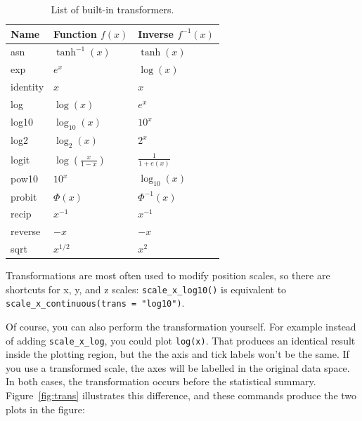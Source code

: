 \begin{table}
  \centering
  \begin{tabular}{lll}
    \toprule
    Name & Function $f(x)$ & Inverse $f^{-1}(x)$ \\
    \midrule
    asn       & $\tanh^{-1}(x)$ & $\tanh(x)$ \\
    exp       & $e ^ x$         & $\log(x)$  \\
    identity  & $x$             & $x$        \\
    log       & $\log(x)$       & $e ^ x$    \\
    log10     & $\log_{10}(x)$  & $10 ^ x$   \\
    log2      & $\log_2(x)$     & $2 ^ x$    \\
    logit     & $\log(\frac{x}{1 - x})$ & $\frac{1}{1 + e(x)} $ \\
    pow10     & $10^x$          & $\log_{10}(x) $ \\
    probit    & $\Phi(x)$       & $\Phi^{-1}(x)$ \\
    recip     & $x^{-1}$        & $x^{-1}$ \\
    reverse   & $-x$            & $-x$     \\
    sqrt      & $x^{1/2}$       & $x ^ 2$  \\
    \bottomrule
  \end{tabular}
  \caption{List of built-in transformers.}
  \label{tbl:common-trans}
\end{table}

Transformations are most often used to modify position scales, so there are shortcuts for x, y, and z scales: \verb|scale_x_log10()| is equivalent to \verb|scale_x_continuous(trans = "log10")|.

Of course, you can also perform the transformation yourself.  For example instead of adding {\tt scale\_x\_log}, you could plot {\tt log(x)}.  That produces an identical result inside the plotting region, but the the axis and tick labels won't be the same.  If you use a transformed scale, the axes will be labelled in the original data space. In both cases, the transformation occurs before the statistical summary. Figure~\ref{fig:trans} illustrates this difference, and these commands produce the two plots in the figure:


% 


